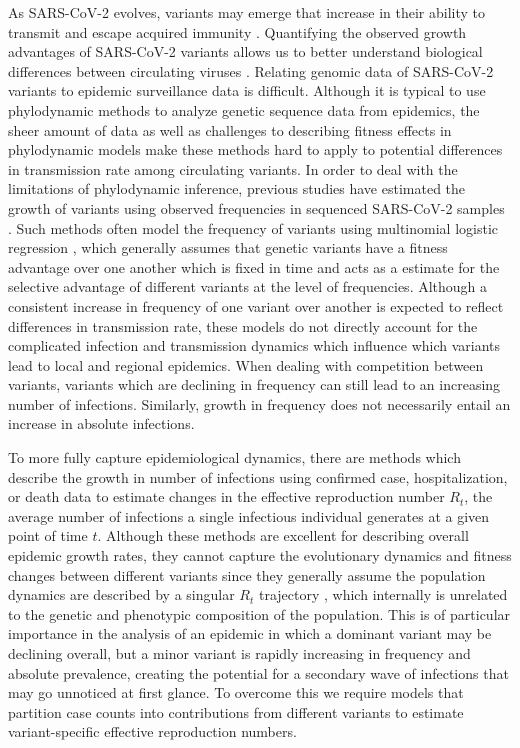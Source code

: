 \documentclass[11pt,oneside,letterpaper]{article}
\begin{document}
As SARS-CoV-2 evolves, variants may emerge that increase in their ability to transmit and escape acquired immunity \cite{tao2021biological}.
Quantifying the observed growth advantages of SARS-CoV-2 variants allows us to better understand biological differences between circulating viruses \cite{tegally2021detection, davies2021estimated}.
Relating genomic data of SARS-CoV-2 variants to epidemic surveillance data is difficult.
Although it is typical to use phylodynamic methods to analyze genetic sequence data from epidemics, the sheer amount of data as well as challenges to describing fitness effects in phylodynamic models make these methods hard to apply to potential differences in transmission rate among circulating variants.
In order to deal with the limitations of phylodynamic inference, previous studies have estimated the growth of variants using observed frequencies in sequenced SARS-CoV-2 samples \cite{Annavajhala2021, Faria2021, Obermeyer2021, Ito2021}.
Such methods often model the frequency of variants using multinomial logistic regression \cite{Annavajhala2021, Obermeyer2021}, which generally assumes that genetic variants have a fitness advantage over one another which is fixed in time and acts as a estimate for the selective advantage of different variants at the level of frequencies.
Although a consistent increase in frequency of one variant over another is expected to reflect differences in transmission rate, these models do not directly account for the complicated infection and transmission dynamics which influence which variants lead to local and regional epidemics.
When dealing with competition between variants, variants which are declining in frequency can still lead to an increasing number of infections.
Similarly, growth in frequency does not necessarily entail an increase in absolute infections.

To more fully capture epidemiological dynamics, there are methods which describe the growth in number of infections using confirmed case, hospitalization, or death data to estimate changes in the effective reproduction number $R_{t}$, the average number of infections a single infectious individual generates at a given point of time $t$.
Although these methods are excellent for describing overall epidemic growth rates, they cannot capture the evolutionary dynamics and fitness changes between different variants since they generally assume the population dynamics are described by a singular $R_{t}$ trajectory \cite{Cori2013, Abbott2020}, which internally is unrelated to the genetic and phenotypic composition of the population.
This is of particular importance in the analysis of an epidemic in which a dominant variant may be declining overall, but a minor variant is rapidly increasing in frequency and absolute prevalence, creating the potential for a secondary wave of infections that may go unnoticed at first glance.
To overcome this we require models that partition case counts into contributions from different variants to estimate variant-specific effective reproduction numbers.
\end{document}
